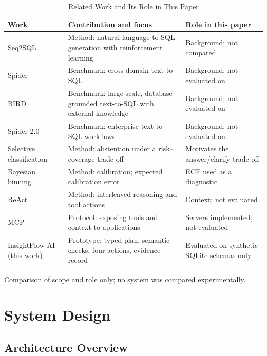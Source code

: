 \documentclass[conference]{IEEEtran}
\begin{document}
\begin{table}[!t]
\caption{Related Work and Its Role in This Paper}
\label{tab:related}
\centering
\footnotesize
\setlength{\tabcolsep}{3pt}
\begin{tabular}{@{}>{\raggedright}p{}>{\raggedright}p{}>{\raggedright\arraybackslash}p{}@{}}
\toprule
\textbf{Work} & \textbf{Contribution and focus} & \textbf{Role in this paper} \\
\midrule
Seq2SQL \cite{zhong2017seq2sql} & Method: natural-language-to-SQL generation with reinforcement learning & Background; not compared \\
Spider \cite{yu2018spider} & Benchmark: cross-domain text-to-SQL & Background; not evaluated on \\
BIRD \cite{li2023bird} & Benchmark: large-scale, database-grounded text-to-SQL with external knowledge & Background; not evaluated on \\
Spider 2.0 \cite{lei2025spider2} & Benchmark: enterprise text-to-SQL workflows & Background; not evaluated on \\
Selective classification \cite{geifman2017selective} & Method: abstention under a risk--coverage trade-off & Motivates the answer/clarify trade-off \\
Bayesian binning \cite{naeini2015bbq} & Method: calibration; expected calibration error & ECE used as a diagnostic \\
ReAct \cite{yao2023react} & Method: interleaved reasoning and tool actions & Context; not evaluated \\
MCP \cite{mcp} & Protocol: exposing tools and context to applications & Servers implemented; not evaluated \\
InsightFlow AI (this work) & Prototype: typed plan, semantic checks, four actions, evidence record & Evaluated on synthetic SQLite schemas only \\
\bottomrule
\end{tabular}

\vspace{3pt}
\parbox{\columnwidth}{\scriptsize Comparison of scope and role only; no system was compared experimentally.}
\end{table}


\section{System Design}

\subsection{Architecture Overview}
\end{document}
